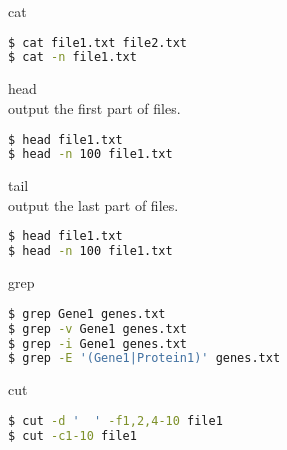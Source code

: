 \documentclass{beamer}
\begin{document}
\begin{frame}[fragile]
 \begin{center}
    \huge{cat}\\
    \end{center}
\begin{lstlisting}[language=bash]
$ cat file1.txt file2.txt
$ cat -n file1.txt
\end{lstlisting}
\end{frame}


\begin{frame}[fragile]
 \begin{center}
    \huge{head}\\
     output the first part of files.\\
    \end{center}
\begin{lstlisting}[language=bash]
$ head file1.txt
$ head -n 100 file1.txt
\end{lstlisting}
\end{frame}


\begin{frame}[fragile]
 \begin{center}
    \huge{tail}\\
     output the last part of files.\\
    \end{center}
\begin{lstlisting}[language=bash]
$ head file1.txt
$ head -n 100 file1.txt
\end{lstlisting}
\end{frame}



\begin{frame}[fragile]
 \begin{center}
    \huge{grep}\\
    \end{center}
\begin{lstlisting}[language=bash]
$ grep Gene1 genes.txt
$ grep -v Gene1 genes.txt
$ grep -i Gene1 genes.txt
$ grep -E '(Gene1|Protein1)' genes.txt
\end{lstlisting}
\end{frame}


\begin{frame}[fragile]
 \begin{center}
    \huge{cut}\\
    \end{center}
\begin{lstlisting}[language=bash]
$ cut -d '	' -f1,2,4-10 file1
$ cut -c1-10 file1
\end{lstlisting}
\end{frame}
\end{document}
